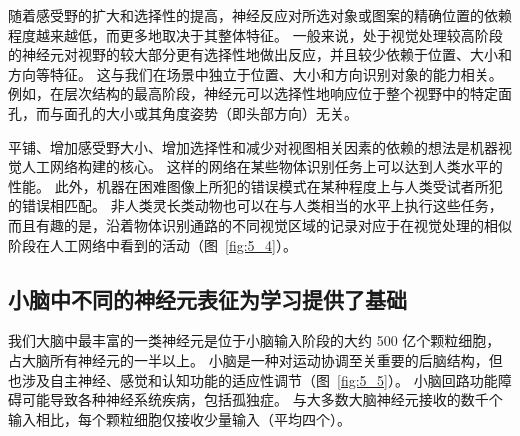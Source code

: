 随着感受野的扩大和选择性的提高，神经反应对所选对象或图案的精确位置的依赖程度越来越低，而更多地取决于其整体特征。
一般来说，处于视觉处理较高阶段的神经元对视野的较大部分更有选择性地做出反应，并且较少依赖于位置、大小和方向等特征。
这与我们在场景中独立于位置、大小和方向识别对象的能力相关。
例如，在层次结构的最高阶段，神经元可以选择性地响应位于整个视野中的特定面孔，而与面孔的大小或其角度姿势（即头部方向）无关。


平铺、增加感受野大小、增加选择性和减少对视图相关因素的依赖的想法是机器视觉人工网络构建的核心。
这样的网络在某些物体识别任务上可以达到人类水平的性能。 
此外，机器在困难图像上所犯的错误模式在某种程度上与人类受试者所犯的错误相匹配。
非人类灵长类动物也可以在与人类相当的水平上执行这些任务，而且有趣的是，沿着物体识别通路的不同视觉区域的记录对应于在视觉处理的相似阶段在人工网络中看到的活动（图~\ref{fig:5_4}）。



\subsection{小脑中不同的神经元表征为学习提供了基础}

我们大脑中最丰富的一类神经元是位于小脑输入阶段的大约 500 亿个颗粒细胞，占大脑所有神经元的一半以上。 
小脑是一种对运动协调至关重要的后脑结构，但也涉及自主神经、感觉和认知功能的适应性调节（图~\ref{fig:5_5}）。
小脑回路功能障碍可能导致各种神经系统疾病，包括孤独症。
与大多数大脑神经元接收的数千个输入相比，每个颗粒细胞仅接收少量输入（平均四个）。


